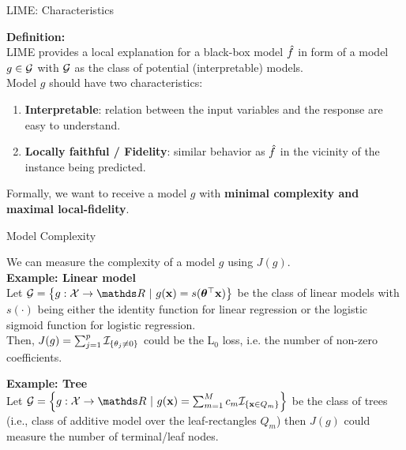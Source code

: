 \documentclass[11pt,compress,t,notes=noshow, aspectratio=169, xcolor=table]{beamer}
\begin{document}
\begin{frame}[c]{LIME: Characteristics}

    \textbf{Definition:}\\
	LIME provides a local explanation for a black-box model $\fh$ in form of a model $g \in \Gspace$ with $\Gspace$ as the class of potential (interpretable) models.\\[2em]
	
	
	Model $g$ should have two characteristics:
	\begin{enumerate}
		\item \textbf{Interpretable}: relation between the input variables and the response are easy to understand.  
		\item \textbf{Locally faithful / Fidelity}: similar behavior as $\fh$ in the vicinity of the instance being predicted.
	\end{enumerate}
	
	\vspace{2em}
	Formally, we want to receive a model $g$ with \textbf{minimal complexity and maximal local-fidelity}. 
\end{frame}


\begin{frame}[c]{Model Complexity}
    
    We can measure the complexity of a model $g$ using $J(g)$. \\[2em]

 	\textbf{Example: Linear model}\\
 	Let $\Gspace = \left\{g: \Xspace \to \R ~|~g(\xv) = s(\thetab^\top \xv)\right\}$ be the class of linear models with $s(\cdot)$ being either the identity function for linear regression or the logistic sigmoid function for logistic regression. \\
 	Then, $J(g) = \sum_{j = 1}^p \Ind_{\{ \theta_j \neq 0 \}}$ could be the L$_0$ loss, i.e. the number of non-zero coefficients. 
 	\vspace{0.5cm}
 	
 	\textbf{Example: Tree}\\
 	Let $\Gspace = \left\{g:\Xspace \to \R ~|~g(\xv) = \sum_{m=1}^M c_m \Ind_{\{ \xv \in Q_m \}}\right\}$ be the class of trees (i.e., class of additive model over the leaf-rectangles $Q_m$) then $J(g)$ could measure the number of terminal/leaf nodes.\\
 	
\end{frame}
 
\end{document}
